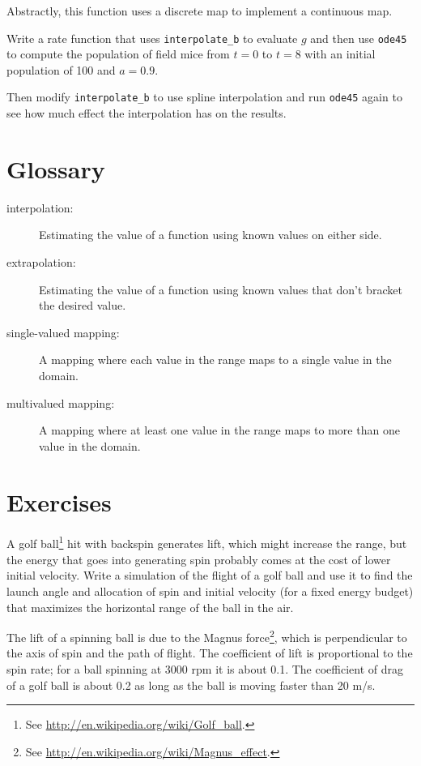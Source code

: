\documentclass{book}
\begin{document}
Abstractly, this function uses a discrete map to implement a
continuous map. 

\begin{ex}
Write a rate function that uses
{\tt interpolate\_b} to evaluate $g$ and then
use {\tt ode45} to compute the population of field mice
from $t=0$ to $t=8$ with an initial population of 100 and
$a=0.9$.

Then modify {\tt interpolate\_b} to use spline interpolation
and run {\tt ode45} again to see how much effect the interpolation
has on the results.
\end{ex}

\section{Glossary}

\begin{description}

\item[interpolation:] Estimating the value of a function using
known values on either side.

\item[extrapolation:] Estimating the value of a function using
known values that don't bracket the desired value.

\item[single-valued mapping:] A mapping where each value in the
range maps to a single value in the domain.

\item[multivalued mapping:] A mapping where at least one value in
the range maps to more than one value in the domain.

\end{description}


\section{Exercises}

\begin{ex}
\label{golf}

A golf ball\footnote{See
\url{http://en.wikipedia.org/wiki/Golf_ball}.} hit with backspin
generates lift, which might increase the range, but the energy that
goes into generating spin probably comes at the cost of lower initial
velocity. Write a simulation of the flight of a golf ball and use it
to find the launch angle and allocation of spin and initial velocity
(for a fixed energy budget) that maximizes the horizontal range of the
ball in the air.

The lift of a spinning ball is due to the Magnus force\footnote{See
\url{http://en.wikipedia.org/wiki/Magnus_effect}.}, which is
perpendicular to the axis of spin and the path of flight. The
coefficient of lift is proportional to the spin rate; for a ball
spinning at 3000 rpm it is about 0.1. The coefficient of drag of a
golf ball is about 0.2 as long as the ball is moving faster than 20 m/s.
\end{ex}
\end{document}
